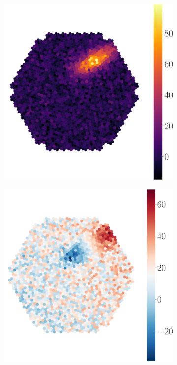 \begin{figure}
	\centering
	\captionsetup{width=0.9\linewidth}
	\begin{subfigure}{.45\textwidth}
  		\centering
  		\includegraphics[width=\linewidth]{Plots/hillas_raw.pdf}
	\end{subfigure}%
	\begin{subfigure}{.45\textwidth}
 		\centering
		\includegraphics[width=\linewidth]{Plots/hillas_raw_time.pdf}

\end{subfigure}
\end{figure}
